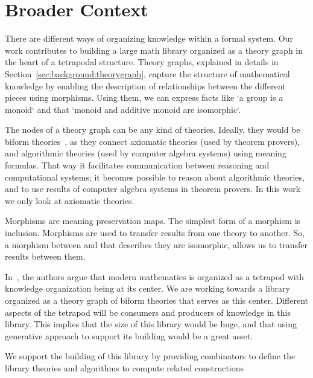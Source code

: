 \section{Broader Context}
\label{sec:broader_context}
There are different ways of organizing knowledge within a formal system. Our work contributes to building a large math library organized as a theory graph in the heart of a tetrapodal structure. Theory graphs, explained in details in Section~\ref{sec:background:theorygraph}, capture the structure of mathematical knowledge by enabling the description of relationships between the different pieces using morphisms. Using them, we can express facts like `a group is a monoid` and that `monoid and additive monoid are isomorphic`. 

The nodes of a theory graph can be any kind of theories. Ideally, they would be biform theories~\cite{biformCICM2018}, as they connect axiomatic theories (used by theorem provers), and algorithmic theories (used by computer algebra systems) using meaning formulas. That way it facilitates communication between reasoning and computational systems; it becomes possible to reason about algorithmic theories, and to use results of computer algebra systems in theorem provers. In this work we only look at axiomatic theories. 

Morphisms are meaning preservation maps. The simplest form of a morphism is inclusion. Morphisms are used to transfer results from one theory to another. So, a morphism between  and  that describes they are isomorphic, allows us to transfer results between them. 

In~\cite{carette2020bigMath}, the authors argue that modern mathematics is organized as a tetrapod with knowledge organization being at its center. We are working towards a library organized as a theory graph of biform theories that serves as this center. Different aspects of the tetrapod will be consumers and producers of knowledge in this library. This implies that the size of this library would be huge, and that using generative approach to support its building would be a great asset. 

We support the building of this library by providing combinators to define the library theories and algorithms to compute related constructions



